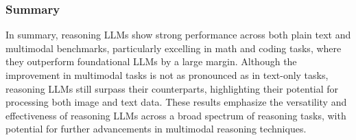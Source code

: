 \subsubsection{Summary}

In summary, reasoning LLMs show strong performance across both plain text and multimodal benchmarks, particularly excelling in math and coding tasks, where they outperform foundational LLMs by a large margin. 
Although the improvement in multimodal tasks is not as pronounced as in text-only tasks, reasoning LLMs still surpass their counterparts, highlighting their potential for processing both image and text data. 
These results emphasize the versatility and effectiveness of reasoning LLMs across a broad spectrum of reasoning tasks, with potential for further advancements in multimodal reasoning techniques.
